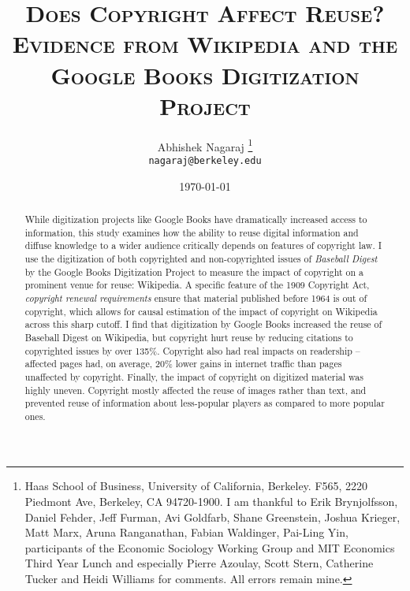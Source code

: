 \documentclass[11pt]{article}
\begin{document}
\setlength{\parskip}{4.5pt}

\baselineskip 18.5pt

\title{\textsc{Does Copyright Affect Reuse?\\ Evidence from Wikipedia and the Google Books Digitization Project}}

\author{Abhishek Nagaraj \footnote{Haas School of Business, University of California, Berkeley. F565, 2220 Piedmont Ave, Berkeley, CA 94720-1900. I am thankful to Erik Brynjolfsson, Daniel Fehder, Jeff Furman, Avi Goldfarb, Shane Greenstein, Joshua Krieger, Matt Marx, Aruna Ranganathan, Fabian Waldinger, Pai-Ling Yin, participants of the Economic Sociology Working Group and MIT Economics Third Year Lunch and especially Pierre Azoulay, Scott Stern, Catherine Tucker and Heidi Williams for comments. All errors remain mine.}
\\         \texttt{nagaraj@berkeley.edu}   
}

\date{\today}

\maketitle
\thispagestyle{empty}


\begin{abstract}
\normalsize
While digitization projects like Google Books have dramatically increased access to information, this study examines how the ability to reuse digital information and diffuse knowledge to a wider audience critically depends on features of copyright law. I use the digitization of both copyrighted and non-copyrighted issues of \emph{Baseball Digest} by the Google Books Digitization Project to measure the impact of copyright on a prominent venue for reuse: Wikipedia. A specific feature of the 1909 Copyright Act, \emph{copyright renewal requirements} ensure that material published before 1964 is out of copyright, which allows for causal estimation of the impact of copyright on Wikipedia across this sharp cutoff. I find that digitization by Google Books increased the reuse of Baseball Digest on Wikipedia, but copyright hurt reuse by reducing citations to copyrighted issues by over 135\%. Copyright also had real impacts on readership -- affected pages had, on average, 20\% lower gains in internet traffic than pages unaffected by copyright. Finally, the impact of copyright on digitized material was highly uneven. Copyright mostly affected the reuse of images rather than text, and prevented reuse of information about less-popular players as compared to more popular ones. 
\end{abstract}
\end{document}
